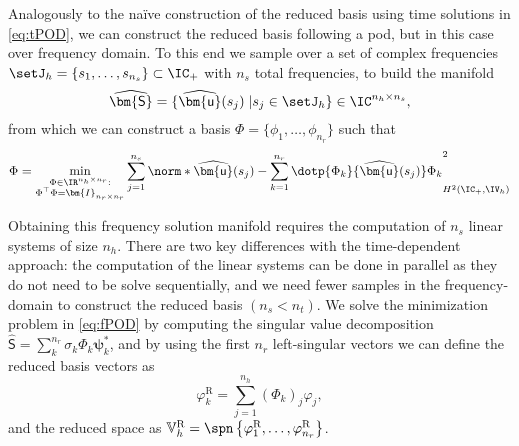 Analogously to the naïve construction of the reduced basis using time solutions in \cref{eq:tPOD}, we can construct the reduced basis following a \gls{pod}, but in this case over frequency domain. 
To this end we sample over a set of complex frequencies $\setJ_h = \left\{s_1,\dots,s_{n_s}\right\} \subset \IC_{+}$ with $n_s$ total frequencies, to build the manifold
\begin{equation} \label{eq:fsnap}
    \widehat{\bm{\mathsf{S}}} = \{ \widehat{\bm{\mathsf{u}}}(s_j) \; | s_j \in \setJ_h \} \in \IC^{n_h \times n_s},
\end{equation}
from which we can construct a basis $\Phi = \{\phi_1,\ldots,\phi_{n_r}\}$ such that
\begin{equation} \label{eq:fPOD}
	\Phi = \min_{\substack{\Phi \in \IR^{n_h \times n_r}: \\ \Phi^{\top} \Phi = \bm{I}_{n_r \times n_r}}}
    	\sum_{j=1}^{n_s} \norm*{\widehat{\bm{\mathsf{u}}}(s_j) - \sum_{k=1}^{n_r} \dotp{\Phi_k}{\widehat{\bm{\mathsf{u}}}(s_j)} \Phi_k
	}^2_{H^2(\IC_+,\IV_h)}
\end{equation}

Obtaining this frequency solution manifold requires the computation of $n_s$ linear systems of size $n_h$. There are two key differences with the time-dependent approach: the computation of the linear systems can be done in parallel as they do not need to be solve sequentially, and we need fewer samples in the frequency-domain to construct the reduced basis $(n_s < n_t)$. We solve the minimization problem in \cref{eq:fPOD} by computing the singular value decomposition $\widehat{\bm{\mathsf{S}}} = \sum_k^{n_r} \sigma_k \Phi_k \bm{\psi}_k^*$, and by using the first $n_r$ left-singular vectors we can define the reduced basis vectors as
\begin{equation}
	\varphi^{\textrm{R}}_k = \sum_{j=1}^{n_h} \left( \Phi_k	\right)_j \varphi_{j},
\end{equation}
and the reduced space as $\mathbb{V}^{\textrm{R}}_{h} = \spn \left\{ \varphi^{\textrm{R}}_1, \dots, \varphi^{\textrm{R}}_{n_r} \right\}$.

